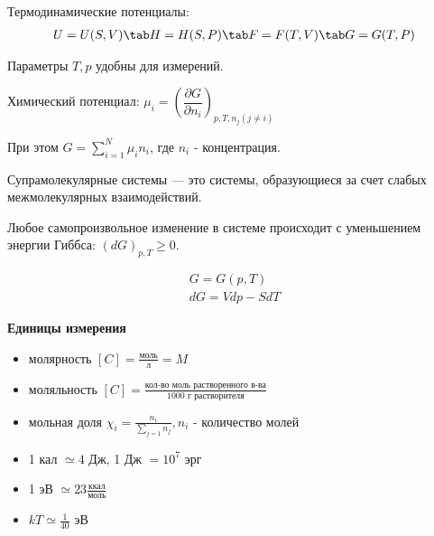 
\begin{lecture}
	
	Термодинамические потенциалы:
	\begin{equation}	
	\begin{aligned}
		U = U(S,V) \tab H = H(S,P) \tab F = F(T,V) \tab G = G(T,P)
	\end{aligned}
	\end{equation}
	
	Параметры $T,p$ удобны для измерений.
	
	\begin{definition}
	Химический потенциал: $\mu_i = \left( \dfrac{\partial G}{\partial n_i} \right)_{p, T, n_j (j \neq i)}$
	\end{definition}
	
	При этом $G = \sum\limits_{i=1}^{N} \mu_i n_i$, где $n_i$ - концентрация.
	
	\begin{definition}
		Супрамолекулярные системы --- это системы, образующиеся за счет слабых межмолекулярных взаимодействий.
	\end{definition}
	
	Любое самопроизвольное изменение в системе происходит с уменьшением энергии Гиббса: $(d G)_{p,T} \geq 0$.
	
	
	\begin{align}
		G = G(p,T) \\
		dG = Vdp - SdT
	\end{align}
	
	\begin{center}
		\textbf{Единицы измерения}\\
	\end{center}

	\begin{itemize}
		\item молярность $[C] = \frac{\text{моль}}{\text{л}} = M$
		\item моляльность $[C] = \frac{\text{кол-во моль растворенного в-ва}}{\text{1000 г растворителя}}$
		\item мольная доля $\chi_i = \frac{n_i}{\sum\limits_{j=1} n_j}, n_i $ - количество молей
		\item 1 кал $\simeq 4$ Дж, 1 Дж $= 10^7$ эрг
		\item 1 эВ $\simeq 23 \frac{\text{ккал}}{\text{моль}}$
		\item $kT \simeq \frac{1}{40}$ эВ
	\end{itemize}


\end{lecture}
